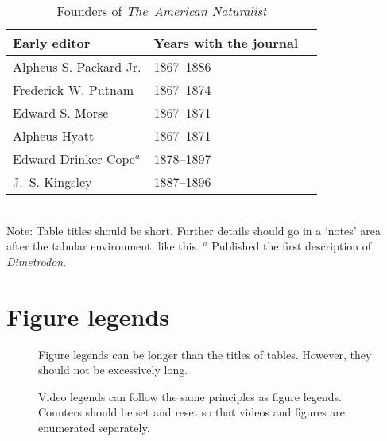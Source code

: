 \documentclass[11pt]{article}
\begin{document}
\begin{table}[h]
\caption{Founders of \textit{The~American Naturalist}}
\label{Table:Founders}
\centering
\begin{tabular}{lll}\hline
Early editor            & Years with the journal \\ \hline
Alpheus S. Packard Jr.  & 1867--1886 \\
Frederick W. Putnam     & 1867--1874 \\ 
Edward S. Morse         & 1867--1871 \\ 
Alpheus Hyatt           & 1867--1871 \\
Edward Drinker Cope$^a$ & 1878--1897 \\
J.~S. Kingsley          & 1887--1896 \\ \hline 
\end{tabular}
\bigskip{}
\\
{\footnotesize Note: Table titles should be short. Further details should go in a `notes' area after the tabular environment, like this. $^a$ Published the first description of \textit{Dimetrodon}.}
\end{table}

\newpage{}

\section*{Figure legends}

\begin{figure}[h!]
\caption{Figure legends can be longer than the titles of tables. However, they should not be excessively long.}
\label{Fig:OkapiHorn}
\end{figure}




\renewcommand{\figurename}{Video} 
\setcounter{figure}{0}

\begin{figure}[h!]
\caption{Video legends can follow the same principles as figure legends. Counters should be set and reset so that videos and figures are enumerated separately.}
\label{VideoExample}
\end{figure}
\end{document}
